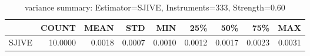 \begin{table}[ht]
\centering
\caption{variance summary: Estimator=SJIVE, Instruments=333, Strength=0.60}
\begin{tabular}{lrrrrrrrr}
\toprule
 & COUNT & MEAN & STD & MIN & 25\% & 50\% & 75\% & MAX \\
\midrule
SJIVE & 10.0000 & 0.0018 & 0.0007 & 0.0010 & 0.0012 & 0.0017 & 0.0023 & 0.0031 \\
\bottomrule
\end{tabular}
\end{table}
